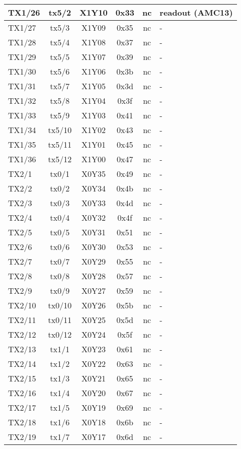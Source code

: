 \begin{longtable}{|l|c|c|c|c|l|}
TX1/26 & tx5/2  & X1Y10 & 0x33 & nc & readout (AMC13)\\\hline
TX1/27 & tx5/3  & X1Y09 & 0x35 & nc & -\\\hline
TX1/28 & tx5/4  & X1Y08 & 0x37 & nc & -\\\hline
TX1/29 & tx5/5  & X1Y07 & 0x39 & nc & -\\\hline
TX1/30 & tx5/6  & X1Y06 & 0x3b & nc & -\\\hline
TX1/31 & tx5/7  & X1Y05 & 0x3d & nc & -\\\hline
TX1/32 & tx5/8  & X1Y04 & 0x3f & nc & -\\\hline
TX1/33 & tx5/9  & X1Y03 & 0x41 & nc & -\\\hline
TX1/34 & tx5/10 & X1Y02 & 0x43 & nc & -\\\hline
TX1/35 & tx5/11 & X1Y01 & 0x45 & nc & -\\\hline
TX1/36 & tx5/12 & X1Y00 & 0x47 & nc & -\\\hline
TX2/1  & tx0/1  & X0Y35 & 0x49 & nc & -\\\hline
TX2/2  & tx0/2  & X0Y34 & 0x4b & nc & -\\\hline
TX2/3  & tx0/3  & X0Y33 & 0x4d & nc & -\\\hline
TX2/4  & tx0/4  & X0Y32 & 0x4f & nc & -\\\hline
TX2/5  & tx0/5  & X0Y31 & 0x51 & nc & -\\\hline
TX2/6  & tx0/6  & X0Y30 & 0x53 & nc & -\\\hline
TX2/7  & tx0/7  & X0Y29 & 0x55 & nc & -\\\hline
TX2/8  & tx0/8  & X0Y28 & 0x57 & nc & -\\\hline
TX2/9  & tx0/9  & X0Y27 & 0x59 & nc & -\\\hline
TX2/10 & tx0/10 & X0Y26 & 0x5b & nc & -\\\hline
TX2/11 & tx0/11 & X0Y25 & 0x5d & nc & -\\\hline
TX2/12 & tx0/12 & X0Y24 & 0x5f & nc & -\\\hline
TX2/13 & tx1/1  & X0Y23 & 0x61 & nc & -\\\hline
TX2/14 & tx1/2  & X0Y22 & 0x63 & nc & -\\\hline
TX2/15 & tx1/3  & X0Y21 & 0x65 & nc & -\\\hline
TX2/16 & tx1/4  & X0Y20 & 0x67 & nc & -\\\hline
TX2/17 & tx1/5  & X0Y19 & 0x69 & nc & -\\\hline
TX2/18 & tx1/6  & X0Y18 & 0x6b & nc & -\\\hline
TX2/19 & tx1/7  & X0Y17 & 0x6d & nc & -\\\hline

\end{longtable}

